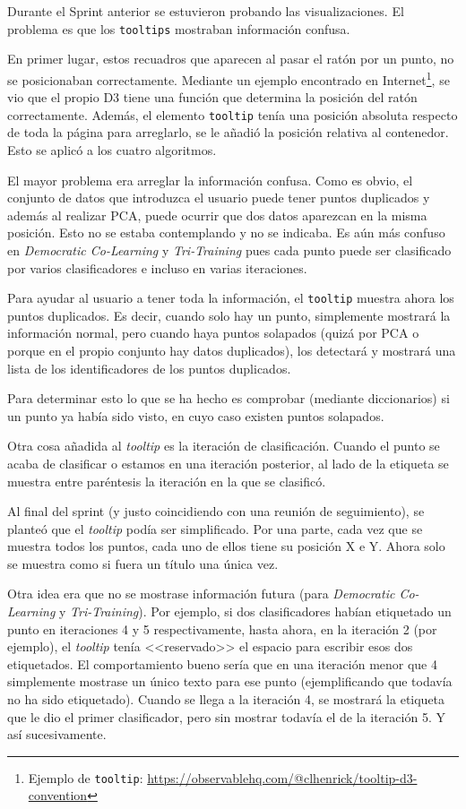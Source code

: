 Durante el Sprint anterior se estuvieron probando las visualizaciones. El
problema es que los \texttt{tooltips} mostraban información confusa.

En primer lugar, estos recuadros que aparecen al pasar el ratón por un punto, no
se posicionaban correctamente. Mediante un ejemplo encontrado en
Internet\footnote{Ejemplo de \texttt{tooltip}:
\url{https://observablehq.com/@clhenrick/tooltip-d3-convention}}, se vio que el
propio D3 tiene una función que determina la posición del ratón correctamente.
Además, el elemento \texttt{tooltip} tenía una posición absoluta respecto de
toda la página para arreglarlo, se le añadió la posición relativa al contenedor.
Esto se aplicó a los cuatro algoritmos.

El mayor problema era arreglar la información confusa. Como es obvio, el
conjunto de datos que introduzca el usuario puede tener puntos duplicados y
además al realizar PCA, puede ocurrir que dos datos aparezcan en la misma
posición. Esto no se estaba contemplando y no se indicaba. Es aún más confuso en
\textit{Democratic Co-Learning} y \textit{Tri-Training} pues cada punto puede
ser clasificado por varios clasificadores e incluso en varias iteraciones.

Para ayudar al usuario a tener toda la información, el \texttt{tooltip} muestra
ahora los puntos duplicados. Es decir, cuando solo hay un punto, simplemente
mostrará la información normal, pero cuando haya puntos solapados (quizá por
PCA o porque en el propio conjunto hay datos duplicados), los detectará y
mostrará una lista de los identificadores de los puntos duplicados.

Para determinar esto lo que se ha hecho es comprobar (mediante diccionarios) si
un punto ya había sido visto, en cuyo caso existen puntos solapados.
 
Otra cosa añadida al \textit{tooltip} es la iteración de clasificación. Cuando
el punto se acaba de clasificar o estamos en una iteración posterior, al lado de
la etiqueta se muestra entre paréntesis la iteración en la que se clasificó.

Al final del sprint (y justo coincidiendo con una reunión de seguimiento), se
planteó que el \textit{tooltip} podía ser simplificado. Por una parte, cada vez
que se muestra todos los puntos, cada uno de ellos tiene su posición X e Y.
Ahora solo se muestra como si fuera un título una única vez.

Otra idea era que no se mostrase información futura (para \textit{Democratic
Co-Learning} y \textit{Tri-Training}). Por ejemplo, si dos clasificadores habían
etiquetado un punto en iteraciones 4 y 5 respectivamente, hasta ahora, en la
iteración 2 (por ejemplo), el \textit{tooltip} tenía <<reservado>> el espacio
para escribir esos dos etiquetados. El comportamiento bueno sería que en una
iteración menor que 4 simplemente mostrase un único texto para ese punto
(ejemplificando que todavía no ha sido etiquetado). Cuando se llega a la
iteración 4, se mostrará la etiqueta que le dio el primer clasificador, pero sin
mostrar todavía el de la iteración 5. Y así sucesivamente.

